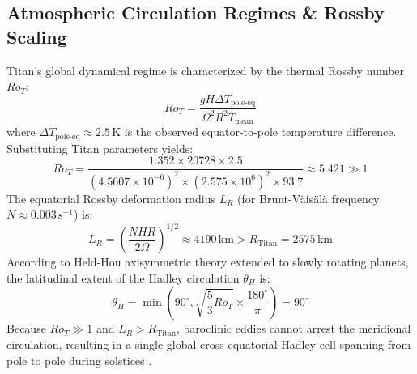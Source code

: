 \documentclass[11pt,a4paper]{article}
\begin{document}
\subsection{Atmospheric Circulation Regimes \& Rossby Scaling}
Titan's global dynamical regime is characterized by the thermal Rossby number $Ro_T$:
\begin{equation}
Ro_T = \frac{g H \Delta T_{\mathrm{pole\text{-}eq}}}{\Omega^2 R^2 T_{\mathrm{mean}}}
\end{equation}
where $\Delta T_{\mathrm{pole\text{-}eq}} \approx 2.5\,\mathrm{K}$ is the observed equator-to-pole temperature difference. Substituting Titan parameters yields:
\begin{equation}
Ro_T = \frac{1.352 \times 20728 \times 2.5}{(4.5607 \times 10^{-6})^2 \times (2.575 \times 10^6)^2 \times 93.7} \approx 5.421 \gg 1
\end{equation}
The equatorial Rossby deformation radius $L_R$ (for Brunt-V\"ais\"al\"a frequency $N \approx 0.003\,\mathrm{s^{-1}}$) is:
\begin{equation}
L_R = \left( \frac{N H R}{2\Omega} \right)^{1/2} \approx 4190\,\mathrm{km} > R_{\mathrm{Titan}} = 2575\,\mathrm{km}
\end{equation}
According to Held-Hou axisymmetric theory extended to slowly rotating planets, the latitudinal extent of the Hadley circulation $\theta_H$ is:
\begin{equation}
\theta_H = \min\left(90^\circ, \sqrt{\frac{5}{3} Ro_T} \times \frac{180^\circ}{\pi}\right) = 90^\circ
\end{equation}
Because $Ro_T \gg 1$ and $L_R > R_{\mathrm{Titan}}$, baroclinic eddies cannot arrest the meridional circulation, resulting in a single global cross-equatorial Hadley cell spanning from pole to pole during solstices \cite{showman2006,mitchell2006}.
\end{document}
